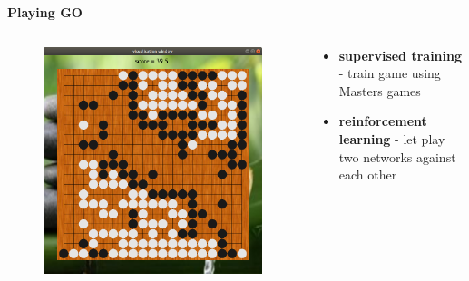 \documentclass[xcolor=dvipsnames]{beamer}
\begin{document}
\begin{frame}{\bf Playing GO}


  \begin{columns}
  \begin{column}{0.5\textwidth}

    \begin{figure}[!htb]
      \centering
      \includegraphics[scale=0.18]{../../pictures/go_board.png}
    \end{figure}


  \end{column}
  \begin{column}{0.5\textwidth}  %

    \scriptsize
    {
      \begin{itemize}
        \item {\bf supervised training} - train game using Masters games
        \item {\bf reinforcement learning} - let play two networks against each other
      \end{itemize}
    }
  \end{column}
  \end{columns}

\end{frame}
\end{document}
